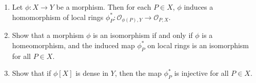 \label{1.3.3}

\begin{enumerate}[label = (\alph*)]
    \item Let $\phi: X \longrightarrow Y$ be a morphism. Then for each $P \in X$, $\phi$ induces a homomorphism of local rings $\phi_P^*: \mathcal O_{\phi(P), Y} \longrightarrow \mathcal O_{P, X}$.
    
    \item Show that a morphism $\phi$ is an isomorphism if and only if $\phi$ is a homeomorphism, and the induced map $\phi_P^*$ on local rings is an isomorphism for all $P \in X$.

    \item Show that if $\phi[X]$ is dense in $Y$, then the map $\phi_P^*$ is injective for all $P \in X$.
\end{enumerate}

